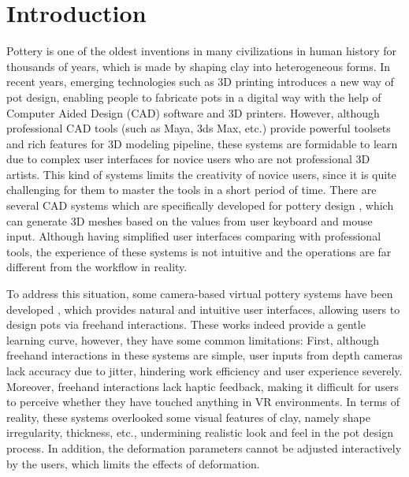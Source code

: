 \documentclass{svjour3}                     %
\begin{document}

\section{Introduction}
\label{sec:1}
Pottery is one of the oldest inventions in many civilizations in human history for thousands of years, which is made by shaping clay into heterogeneous forms.
In recent years, emerging technologies such as 3D printing introduces a new way of pot design, enabling people to fabricate pots in a digital way with the help of Computer Aided Design (CAD) software and 3D printers.
However, although professional CAD tools (such as Maya\cite{website:maya}, 3ds Max\cite{website:3dmax}, etc.) provide powerful toolsets and rich features for 3D modeling pipeline, these systems are formidable to learn due to complex user interfaces for novice users who are not professional 3D artists. 
This kind of systems limits the creativity of novice users, since it is quite challenging for them to master the tools in a short period of time.
There are several CAD systems which are specifically developed for pottery design \cite{koutsoudis2009qp,kumar2011wheel}, which can generate 3D meshes based on the values from user keyboard and mouse input. Although having simplified user interfaces comparing with professional tools, the experience of these systems is not intuitive and the operations are far different from the workflow in reality.

To address this situation, some camera-based virtual pottery systems have been developed \cite{ramani2015gesture,murugappan2013handy,han2014virtual}, which provides natural and intuitive user interfaces, allowing users to design pots via freehand interactions.
These works indeed provide a gentle learning curve, however, they have some common limitations:
First, although freehand interactions in these systems are simple, user inputs from depth cameras lack accuracy due to jitter, hindering work efficiency and user experience severely.
%
Moreover, freehand interactions lack haptic feedback, making it difficult for users to perceive whether they have touched anything in VR environments. In terms of reality, these systems overlooked some visual features of clay, namely shape irregularity, thickness, etc., undermining realistic look and feel in the pot design process.
%
In addition, the deformation parameters cannot be adjusted interactively by the users, which limits the effects of deformation.
\end{document}
